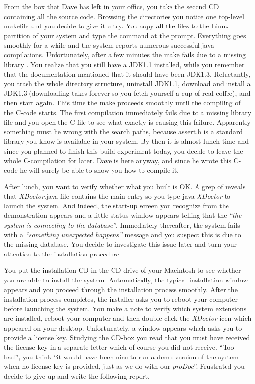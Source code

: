 \documentclass[a4paper,10pt,twoside]{book}
\begin{document}
From the box that Dave has left in your office, you take the second CD containing all the source code. Browsing the directories you notice one top-level makefile and you decide to give it a try. You copy all the files to the Linux partition of your system and type the command  at the prompt. Everything goes smoothly for a while and the system reports numerous successful java compilations. Unfortunately, after a few minutes the make fails due to a missing library . You realize that you still have a JDK1.1 installed, while you remember that the documentation mentioned that it should have been JDK1.3. Reluctantly, you trash the whole directory structure, uninstall JDK1.1, download and install a JDK1.3 (downloading takes forever so you fetch yourself a cup of real coffee), and then start again. This time the make proceeds smoothly until the compiling of the C-code starts. The first compilation immediately fails due to a missing library file and you open the C-file to see what exactly is causing this failure. Apparently something must be wrong with the search paths, because assert.h is a standard library you know is available in your system. By then it is almost lunch-time and since you planned to finish this build experiment today, you decide to leave the whole C-compilation for later. Dave is here anyway, and since he wrote this C-code he will surely be able to show you how to compile it.

After lunch, you want to verify whether what you built is OK. A grep of  reveals that \emph{XDoctor}.java file contains the main entry so you type java \emph{XDoctor} to launch the system. And indeed, the start-up screen you recognize from the demonstration appears and a little status window appears telling that the \emph{``the system is connecting to the database''}. Immediately thereafter, the system fails with a \emph{``something unexpected happens''} message and you suspect this is due to the missing database. You decide to investigate this issue later and turn your attention to the installation procedure.

You put the installation-CD in the CD-drive of your Macintosh to see whether you are able to install the system. Automatically, the typical installation window appears and you proceed through the installation process smoothly. After the installation process completes, the installer asks you to reboot your computer before launching the system. You make a note to verify which system extensions are installed, reboot your computer and then double-click the \emph{XDoctor} icon which appeared on your desktop. Unfortunately, a window appears which asks you to provide a license key. Studying the CD-box you read that you must have received the license key in a separate letter which of course you did not receive. ``Too bad'', you think ``it would have been nice to run a demo-version of the system when no license key is provided, just as we do with our \emph{proDoc}''. Frustrated you decide to give up and write the following report.
\end{document}
